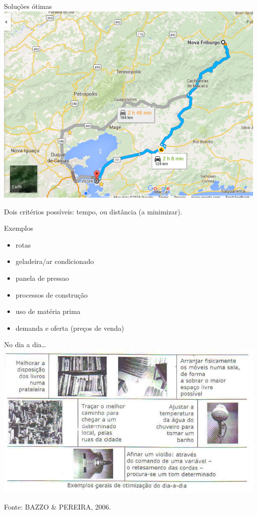 \documentclass{beamer}
\begin{document}
\begin{frame}{Soluções ótimas}
  \centering
  \includegraphics[width=.9\textwidth]{otimizacao/rotas}

Dois critérios possíveis: tempo, ou distância (a minimizar).
\end{frame}

\begin{frame}{Exemplos}
  \begin{itemize}
  \item rotas
  \item geladeira/ar condicionado
  \item panela de pressao
  \item processos de construção
  \item uso de matéria prima
  \item demanda e oferta (preços de venda)
  \end{itemize}
\end{frame}

\begin{frame}{No dia a dia\ldots}
  \centering
  \includegraphics[width=.9\textwidth]{otimizacao/dia_a_dia}

\vfill
Fonte: BAZZO \& PEREIRA, 2006.
\end{frame}
\end{document}
